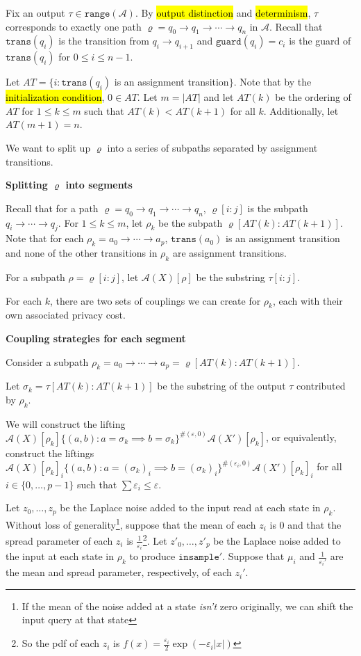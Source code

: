 \documentclass[12pt]{article}
\newcommand{\range}{\texttt{range}}
\newcommand{\trans}{\texttt{trans}}
\theoremstyle{definition}
\begin{document}
Fix an output $\tau \in \range(\mathcal{A})$. By \hl{output distinction} and \hl{determinism}, $\tau$ corresponds to exactly one path $\varrho=q_0\to q_1\to \cdots \to q_n$ in $\mathcal{A}$. 
Recall that $\texttt{trans}(q_i)$ is the transition from $q_i\to q_{i+1}$ and $\texttt{guard}(q_i) = c_i$ is the guard of $\texttt{trans}(q_i)$ for $0\leq i \leq n-1$.

Let $AT = \{i: \texttt{trans}(q_i)$ is an assignment transition$\}$. Note that by the \hl{initialization condition}, $0\in AT$. Let $m = |AT|$ and let $AT(k)$ be the ordering of $AT$ for $1\leq k \leq m$ such that $AT(k) < AT(k+1)$ for all $k$. Additionally, let $AT(m+1) = n$.

We want to split up $\varrho$ into a series of subpaths separated by assignment transitions. 

\textbf{Splitting $\varrho$ into segments}

Recall that for a path $\varrho=q_0\to q_1\to \cdots \to q_n$, $\varrho[i:j]$ is the subpath $q_i\to \cdots \to q_j$. For $1\leq k\leq m$, let $\rho_k$ be the subpath $\varrho[AT(k):AT(k+1)]$. Note that for each $\rho_k = a_0\to\cdots\to a_p$, $\trans(a_0)$ is an assignment transition and none of the other transitions in $\rho_k$ are assignment transitions. 

For a subpath $\rho = \varrho[i:j]$, let $\mathcal{A}(X)[\rho]$ be the substring $\tau[i:j]$.

For each $k$, there are two sets of couplings we can create for $\rho_k$, each with their own associated privacy cost.

\textbf{Coupling strategies for each segment}

Consider a subpath $\rho_k = a_0\to \cdots \to a_p = \varrho[AT(k):AT(k+1)]$. 

Let $\sigma_k = \tau[AT(k):AT(k+1)]$ be the substring of the output $\tau$ contributed by $\rho_k$. 

We will construct the lifting $\mathcal{A}(X)[\rho_k]\{(a, b): a = \sigma_k \implies b = \sigma_k\}^{\#(\varepsilon, 0)}\mathcal{A}(X')[\rho_k]$, or equivalently, construct the liftings $\mathcal{A}(X)[\rho_k]_i\{(a, b): a = (\sigma_k)_i \implies b = (\sigma_k)_i\}^{\#(\varepsilon_i, 0)}\mathcal{A}(X')[\rho_k]_i$ for all $i\in \{0, \ldots, p-1\}$ such that $\sum\varepsilon_i \leq \varepsilon$.

Let $z_0, \ldots, z_p$ be the Laplace noise added to the input read at each state in $\rho_k$. Without loss of generality\footnote{If the mean of the noise added at a state \textit{isn't} zero originally, we can shift the input query at that state}, suppose that the mean of each $z_i$ is 0 and that the spread parameter of each $z_i$ is $\frac{1}{\varepsilon_i}$\footnote{So the pdf of each $z_i$ is $f(x) = \frac{\varepsilon_i}{2}\exp(-\varepsilon_i|x|)$}. 
Let $z'_0, \ldots, z'_p$ be the Laplace noise added to the input at each state in $\rho_k$ to produce $\texttt{insample}'$. Suppose that $\mu_i$ and $\frac{1}{\varepsilon_i'}$ are the mean and spread parameter, respectively, of each $z_i'$. 
\end{document}
